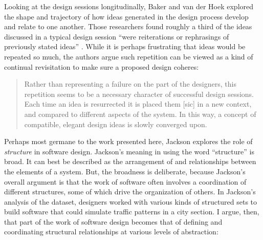 Looking at the design sessions longitudinally, Baker and van der Hoek \citeyearpar{baker_ideas_2010} explored the shape and trajectory of how ideas generated in the design process develop and relate to one another. Those researchers found roughly a third of the ideas discussed in a typical design session ``were reiterations or rephrasings of previously stated ideas'' \citep[ p.~604]{baker_ideas_2010}. While it is perhaps frustrating that ideas would be repeated so much, the authors argue such repetition can be viewed as a kind of continual revisitation to make sure a proposed design coheres:

\begin{quote}
Rather than representing a failure on the part of the designers, this repetition seems to be a necessary character of successful design sessions. Each time an idea is resurrected it is placed them {[}sic{]} in a new context, and compared to different aspects of the system. In this way, a concept of compatible, elegant design ideas is slowly converged upon. \citep[ p.~607]{baker_ideas_2010}
\end{quote}

Perhaps most germane to the work presented here, Jackson \citeyearpar{jackson_representing_2010} explores the role of \emph{structure} in software design. Jackson's meaning in using the word ``structure'' is broad. It can best be described as the arrangement of and relationships between the elements of a system. But, the broadness is deliberate, because Jackson's overall argument is that the work of software often involves a coordination of different structures, some of which drive the organization of others. In Jackson's \citeyearpar{jackson_representing_2010} analysis of the dataset, designers worked with various kinds of structured sets to build software that could simulate traffic patterns in a city section. I argue, then, that part of the work of software design becomes that of defining and coordinating structural relationships at various levels of abstraction:

